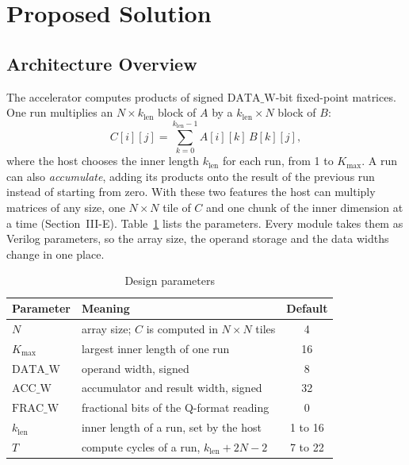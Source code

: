 
\section{Proposed Solution}
\subsection{Architecture Overview}
The accelerator computes products of signed $\mathrm{DATA\_W}$-bit fixed-point matrices. One run multiplies an $N \times k_{\mathrm{len}}$ block of $A$ by a $k_{\mathrm{len}} \times N$ block of $B$:
\begin{equation}
C[i][j] = \sum_{k=0}^{k_{\mathrm{len}}-1} A[i][k]\,B[k][j],
\label{eq:matmul}
\end{equation}
where the host chooses the inner length $k_{\mathrm{len}}$ for each run, from 1 to $K_{\max}$. A run can also \emph{accumulate}, adding its products onto the result of the previous run instead of starting from zero. With these two features the host can multiply matrices of any size, one $N \times N$ tile of $C$ and one chunk of the inner dimension at a time (Section~III-E). Table~\ref{tab:params} lists the parameters. Every module takes them as Verilog parameters, so the array size, the operand storage and the data widths change in one place.

\begin{table}[t]
\centering
\caption{Design parameters}
\label{tab:params}
\footnotesize
\begin{tabular}{@{}llc@{}}
\toprule
Parameter & Meaning & Default \\
\midrule
$N$ & array size; $C$ is computed in $N \times N$ tiles & 4 \\
$K_{\max}$ & largest inner length of one run & 16 \\
$\mathrm{DATA\_W}$ & operand width, signed & 8 \\
$\mathrm{ACC\_W}$ & accumulator and result width, signed & 32 \\
$\mathrm{FRAC\_W}$ & fractional bits of the Q-format reading & 0 \\
\midrule
$k_{\mathrm{len}}$ & inner length of a run, set by the host & 1 to 16 \\
$T$ & compute cycles of a run, $k_{\mathrm{len}} + 2N - 2$ & 7 to 22 \\
\bottomrule
\end{tabular}
\end{table}

